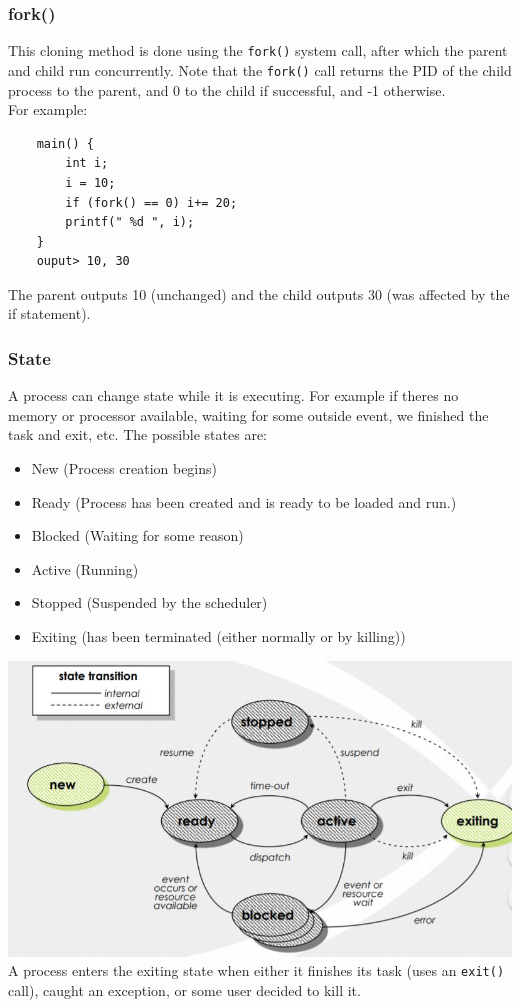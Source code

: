 \documentclass[12pt]{article}
\theoremstyle{definition}
\begin{document}
\subsubsection{fork()}
This cloning method is done using the \texttt{fork()} system call, after which the parent and child run concurrently. Note that the \texttt{fork()} call returns the PID of the child process to the parent, and 0 to the child if successful, and -1 otherwise.
\\ \linebreak
For example:
\begin{lstlisting}
	main() {
		int i;
		i = 10;
		if (fork() == 0) i+= 20;
		printf(" %d ", i);
	}
	ouput> 10, 30
\end{lstlisting}
The parent outputs 10 (unchanged) and the child outputs 30 (was affected by the if statement).

\subsubsection{State}
A process can change state while it is executing. For example if theres no memory or processor available, waiting for some outside event, we finished the task and exit, etc. The possible states are:

\begin{itemize}
	\item New (Process creation begins)
	\item Ready (Process has been created and is ready to be loaded and run.)
	\item Blocked (Waiting for some reason)
	\item Active (Running)
	\item Stopped (Suspended by the scheduler)
	\item Exiting (has been terminated (either normally or by killing))
\end{itemize}
\includegraphics{state_diagram}
A process enters the exiting state when either it finishes its task (uses an \texttt{exit()} call), caught an exception, or some user decided to kill it.
\end{document}
